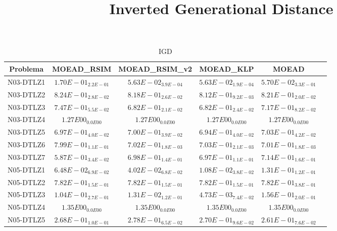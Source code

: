 \documentclass{article}
\title{Inverted Generational Distance}
\author{}
\begin{document}
\maketitle
\begin{table*}[ht!]
\scriptsize
\caption{IGD}
\centering\begin{tabular}{|c||c||c||c||c||c|} \hline
Problema &MOEAD_RSIM &MOEAD_RSIM_v2 &MOEAD_KLP &MOEAD\\\hline
N03-DTLZ1 &$1.70E-01_{2.2E-01}$ &\cellcolor{gray95}$5.63E-02_{3.9E-04}$ &\cellcolor{gray25}$5.63E-02_{1.9E-04}$ &$5.70E-02_{3.3E-01}$\\ 
\hline
N03-DTLZ2 &$8.24E-01_{2.8E-02}$ &\cellcolor{gray25}$8.18E-01_{2.6E-02}$ &\cellcolor{gray95}$8.12E-01_{9.2E-03}$ &$8.21E-01_{2.0E-02}$\\ 
\hline
N03-DTLZ3 &$7.47E-01_{5.5E-02}$ &\cellcolor{gray95}$6.82E-01_{2.1E-02}$ &\cellcolor{gray25}$6.82E-01_{2.4E-02}$ &$7.17E-01_{8.2E-02}$\\ 
\hline
N03-DTLZ4 &\cellcolor{gray95}$1.27E00_{0.0E00}$ &\cellcolor{gray25}$1.27E00_{0.0E00}$ &$1.27E00_{0.0E00}$ &$1.27E00_{0.0E00}$\\ 
\hline
N03-DTLZ5 &\cellcolor{gray25}$6.97E-01_{4.0E-02}$ &$7.00E-01_{3.9E-02}$ &\cellcolor{gray95}$6.94E-01_{4.0E-02}$ &$7.03E-01_{4.2E-02}$\\ 
\hline
N03-DTLZ6 &$7.99E-01_{1.1E-01}$ &\cellcolor{gray25}$7.02E-01_{1.8E-03}$ &$7.03E-01_{2.1E-03}$ &\cellcolor{gray95}$7.01E-01_{1.8E-03}$\\ 
\hline
N03-DTLZ7 &\cellcolor{gray95}$5.87E-01_{3.4E-02}$ &$6.98E-01_{1.4E-01}$ &\cellcolor{gray25}$6.97E-01_{1.1E-01}$ &$7.14E-01_{1.6E-01}$\\ 
\hline
N05-DTLZ1 &$6.48E-02_{6.9E-02}$ &\cellcolor{gray25}$4.02E-02_{6.8E-02}$ &\cellcolor{gray95}$1.08E-02_{3.8E-02}$ &$1.31E-01_{1.2E-01}$\\ 
\hline
N05-DTLZ2 &\cellcolor{gray95}$7.82E-01_{1.5E-01}$ &\cellcolor{gray25}$7.82E-01_{1.5E-01}$ &$7.82E-01_{1.5E-01}$ &$7.82E-01_{3.8E-01}$\\ 
\hline
N05-DTLZ3 &$1.04E-01_{2.7E-01}$ &\cellcolor{gray25}$1.31E-02_{1.2E-01}$ &\cellcolor{gray95}$4.73E-03_{7.4E-02}$ &$1.56E-01_{2.0E-01}$\\ 
\hline
N05-DTLZ4 &\cellcolor{gray95}$1.35E00_{0.0E00}$ &\cellcolor{gray25}$1.35E00_{0.0E00}$ &$1.35E00_{0.0E00}$ &$1.35E00_{0.0E00}$\\ 
\hline
N05-DTLZ5 &\cellcolor{gray25}$2.68E-01_{1.0E-01}$ &$2.78E-01_{6.5E-02}$ &$2.70E-01_{9.6E-02}$ &\cellcolor{gray95}$2.61E-01_{7.6E-02}$\\ 

\end{tabular}
\end{table*}
\end{document}

